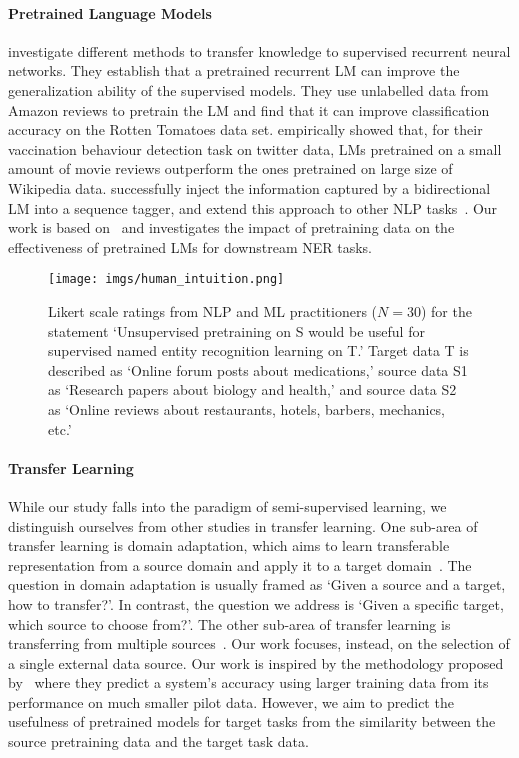 \documentclass[11pt,a4paper]{article}
\begin{document}
\paragraph{Pretrained Language Models}
\citet{Dai:Le:NIPS:2015} investigate different methods to transfer knowledge to supervised recurrent neural networks. 
They establish that a pretrained recurrent LM can improve the generalization ability of the supervised models. 
They use unlabelled data from Amazon reviews to pretrain the LM and find that it can improve classification accuracy on the Rotten Tomatoes data set.
\citet{Joshi:Dai:SMM4H:2018} empirically showed that, for their vaccination behaviour detection task on twitter data, LMs pretrained on a small amount of movie reviews outperform the ones pretrained on large size of Wikipedia data.
\citet{Peters:Ammar:ACL:2017} successfully inject the information captured by a bidirectional LM into a sequence tagger, and extend this approach to other NLP tasks~\citep{Peters:Neumann:NAACL:2018}. 
Our work is based on~\citep{Peters:Neumann:NAACL:2018} and investigates the impact of pretraining data on the effectiveness of pretrained LMs for downstream NER tasks.


\begin{figure*}[ht]
    \centering
    \texttt{[image: imgs/human\_intuition.png]}
    \caption{Likert scale ratings from NLP and ML practitioners ($N=30$) for the statement `Unsupervised pretraining on S would be useful for supervised named entity recognition learning on T.' Target data T is described as `Online forum posts about medications,' source data S1 as `Research papers about biology and health,' and source data S2 as `Online reviews about restaurants, hotels, barbers, mechanics, etc.'~\label{fig:human-intuition}}
\end{figure*}

\paragraph{Transfer Learning}
While our study falls into the paradigm of semi-supervised learning, we distinguish ourselves from other studies in transfer learning. 
One sub-area of transfer learning is domain adaptation, which aims to learn transferable representation from a source domain and apply it to a target domain~\citep{Blitzer:McDonald:EMNLP:2006,Yang:Eisenstein:NAACL:2015}. 
The question in domain adaptation is usually framed as `Given a source and a target, how to transfer?'. 
In contrast, the question we address is `Given a specific target, which source to choose from?'. 
The other sub-area of transfer learning is transferring from multiple sources~\citep{Yin:Schutze:CoNLL:2015,Li:Baldwin:NAACL:2018}. 
Our work focuses, instead, on the selection of a single external data source. 
Our work is inspired by the methodology proposed by~\citet{Johnson:Anderson:ACL:2018} where they predict a system's accuracy using larger training data from its performance on much smaller pilot data. 
However, we aim to predict the usefulness of pretrained models for target tasks from the similarity between the source pretraining data and the target task data.
\end{document}
